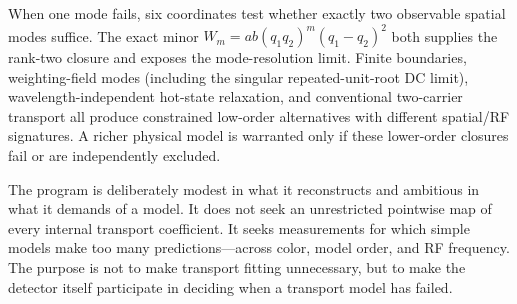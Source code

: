 \documentclass[11pt]{article}
\begin{document}
When one mode fails, six coordinates test whether exactly two observable spatial modes suffice. The exact minor $W_m=ab(q_1q_2)^m(q_1-q_2)^2$ both supplies the rank-two closure and exposes the mode-resolution limit. Finite boundaries, weighting-field modes (including the singular repeated-unit-root DC limit), wavelength-independent hot-state relaxation, and conventional two-carrier transport all produce constrained low-order alternatives with different spatial/RF signatures. A richer physical model is warranted only if these lower-order closures fail or are independently excluded.

The program is deliberately modest in what it reconstructs and ambitious in what it demands of a model. It does not seek an unrestricted pointwise map of every internal transport coefficient. It seeks measurements for which simple models make too many predictions---across color, model order, and RF frequency. The purpose is not to make transport fitting unnecessary, but to make the detector itself participate in deciding when a transport model has failed.
\end{document}
